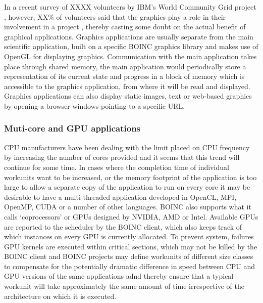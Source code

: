   In a  recent survey of XXXX volunteers by IBM's World Community Grid project \cite{wcg}, however, XX\% of volunteers said that the graphics play a role in their involvement in a project \cite{wcg2013}, thereby casting some doubt on the actual benefit of graphical applications. Graphics applications are usually separate from the main scientific application, built on  a specific  BOINC graphics library and makes use of OpenGL \cite{opengl} for displaying graphics. Communication with the main application takes place through shared memory, the main application would periodically store a representation of its current state and progress in  a block of memory which is accessible to the graphics application, from where it will be read and displayed. Graphics applications can also display static images, text or web-based graphics by opening a browser windows pointing to a specific URL.

\subsubsection{Muti-core and GPU applications}
CPU manufacturers have been dealing with the limit placed on CPU frequency by increasing the number of cores provided and it seems that this trend will continue for some time. In cases where the completion time of individual workunits want to be increased, or the memory footprint of the application is too large to allow a separate copy of the application to run on every core it may be desirable to have a multi-threaded application developed in OpenCL, MPI, OpenMP, CUDA or a number of other languages. BOINC also supports what it calls `coprocessors' or GPUs designed by NVIDIA, AMD or Intel. Available GPUs are reported to the scheduler by the BOINC client, which also keeps track of which instances on every GPU is currently allocated. To prevent system, failures GPU kernels are  executed within critical sections, which may not be killed by the BOINC client and  BOINC projects may define workunits of different size classes to compensate for the potentially dramatic difference in speed between CPU and GPU versions of the same applications adnd thereby ensure that a typical workunit will take approximately the same amount of time irrespective of the architecture on which it is executed.

